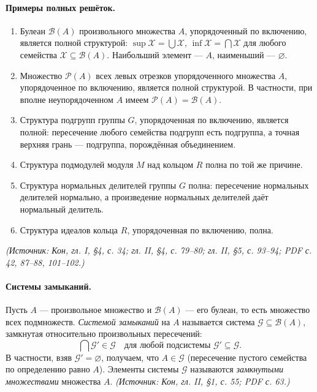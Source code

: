 \documentclass[a4paper,12pt]{article}
\begin{document}
\paragraph{Примеры полных решёток.}
\begin{enumerate}[label=(\arabic*)]
\item Булеан \(\mathcal{B}(A)\) произвольного множества \(A\), упорядоченный по включению, является полной структурой: \(\sup\mathcal{X}=\bigcup\mathcal{X}\), \(\inf\mathcal{X}=\bigcap\mathcal{X}\) для любого семейства \(\mathcal{X}\subseteq\mathcal{B}(A)\). Наибольший элемент — \(A\), наименьший — \(\varnothing\).
\item Множество \(\mathcal{P}(A)\) всех левых отрезков упорядоченного множества \(A\), упорядоченное по включению, является полной структурой. В частности, при вполне неупорядоченном \(A\) имеем \(\mathcal{P}(A)=\mathcal{B}(A)\).
\item Структура подгрупп группы \(G\), упорядоченная по включению, является полной: пересечение любого семейства подгрупп есть подгруппа, а точная верхняя грань — подгруппа, порождённая объединением.
\item Структура подмодулей модуля \(M\) над кольцом \(R\) полна по той же причине.
\item Структура нормальных делителей группы \(G\) полна: пересечение нормальных делителей нормально, а произведение нормальных делителей даёт нормальный делитель.
\item Структура идеалов кольца \(R\), упорядоченная по включению, полна.
\end{enumerate}
\textit{(Источник: Кон, гл. I, §4, с. 34; гл. II, §4, с. 79--80; гл. II, §5, с. 93--94; PDF с. 42, 87--88, 101--102.)}

\paragraph{Системы замыканий.}
Пусть \(A\) — произвольное множество и \(\mathcal{B}(A)\) — его булеан, то есть множество всех подмножеств. \emph{Системой замыканий} на \(A\) называется система \(\mathcal{G}\subseteq\mathcal{B}(A)\), замкнутая относительно произвольных пересечений:
\[
\bigcap\mathcal{G}'\in\mathcal{G}\quad\text{для любой подсистемы }\mathcal{G}'\subseteq\mathcal{G}.
\]
В частности, взяв \(\mathcal{G}'=\varnothing\), получаем, что \(A\in\mathcal{G}\) (пересечение пустого семейства по определению равно \(A\)). Элементы системы \(\mathcal{G}\) называются \emph{замкнутыми множествами} множества \(A\).
\textit{(Источник: Кон, гл. II, §1, с. 55; PDF с. 63.)}
\end{document}
